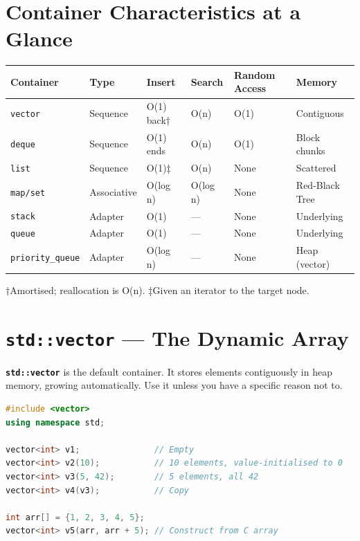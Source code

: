 \section{Container Characteristics at a Glance}
\label{sec:container-overview}

\begin{center}
\begin{tabular}{|l|l|l|l|l|l|}
\hline
\textbf{Container} & \textbf{Type} & \textbf{Insert} & \textbf{Search} & \textbf{Random Access} & \textbf{Memory} \\
\hline
\texttt{vector}   & Sequence    & O(1) back†   & O(n)      & O(1)  & Contiguous \\
\texttt{deque}    & Sequence    & O(1) ends    & O(n)      & O(1)  & Block chunks \\
\texttt{list}     & Sequence    & O(1)‡        & O(n)      & None  & Scattered \\
\texttt{map/set}  & Associative & O(log n)     & O(log n)  & None  & Red-Black Tree \\
\texttt{stack}    & Adapter     & O(1)         & ---       & None  & Underlying \\
\texttt{queue}    & Adapter     & O(1)         & ---       & None  & Underlying \\
\texttt{priority\_queue} & Adapter & O(log n)  & ---       & None  & Heap (vector) \\
\hline
\end{tabular}
\end{center}

†Amortised; reallocation is O(n). ‡Given an iterator to the target node.

\section{\texttt{std::vector} --- The Dynamic Array}
\label{sec:vector}

\textbf{\texttt{std::vector}} is the default container. It stores elements contiguously in heap memory, growing automatically. Use it unless you have a specific reason not to.

\begin{lstlisting}[language=C++, caption={Declaring and initialising vectors}]
#include <vector>
using namespace std;

vector<int> v1;               // Empty
vector<int> v2(10);           // 10 elements, value-initialised to 0
vector<int> v3(5, 42);        // 5 elements, all 42
vector<int> v4(v3);           // Copy

int arr[] = {1, 2, 3, 4, 5};
vector<int> v5(arr, arr + 5); // Construct from C array
\end{lstlisting}

